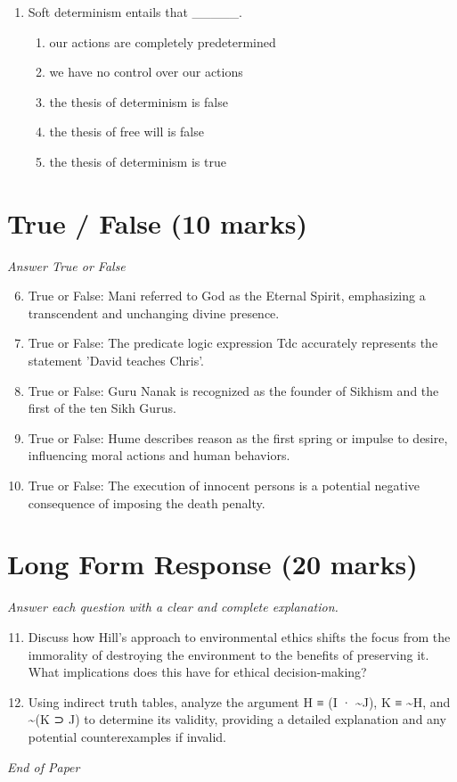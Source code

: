 \documentclass[12pt]{article}
\begin{document}
\begin{enumerate}[label=\arabic*.]
\begin{enumerate}[label=(\alph*)]
    \item negotiable and fluctuating.
    \item indirect but fundamental.
\end{enumerate}
\item Soft determinism entails that \_\_\_\_\_.
\begin{enumerate}[label=(\alph*)]
    \item our actions are completely predetermined
    \item we have no control over our actions
    \item the thesis of determinism is false
    \item the thesis of free will is false
    \item the thesis of determinism is true
\end{enumerate}
\end{enumerate}

\section*{True / False (10 marks)}
\textit{Answer True or False}
\begin{enumerate}[label=\arabic*.]
\setcounter{enumi}{5}
\item True or False: Mani referred to God as the Eternal Spirit, emphasizing a transcendent and unchanging divine presence.
\item True or False: The predicate logic expression Tdc accurately represents the statement 'David teaches Chris'.
\item True or False: Guru Nanak is recognized as the founder of Sikhism and the first of the ten Sikh Gurus.
\item True or False: Hume describes reason as the first spring or impulse to desire, influencing moral actions and human behaviors.
\item True or False: The execution of innocent persons is a potential negative consequence of imposing the death penalty.
\end{enumerate}

\section*{Long Form Response (20 marks)}
\textit{Answer each question with a clear and complete explanation.}
\begin{enumerate}[label=\arabic*.]
\setcounter{enumi}{10}
\item Discuss how Hill's approach to environmental ethics shifts the focus from the immorality of destroying the environment to the benefits of preserving it. What implications does this have for ethical decision-making?
\item Using indirect truth tables, analyze the argument H ≡ (I · \textasciitilde{}J), K ≡ \textasciitilde{}H, and \textasciitilde{}(K ⊃ J) to determine its validity, providing a detailed explanation and any potential counterexamples if invalid.
\end{enumerate}

\vfill
\noindent\textit{End of Paper}
\end{document}
